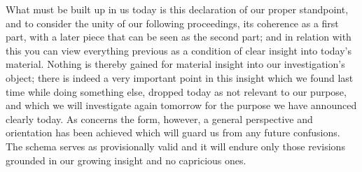 What must be built up in us today is
this declaration of our proper standpoint,
and to consider the unity of our following proceedings,
its coherence as a first part,
with a later piece that can be seen as the second part;
and in relation with this you can view
everything previous as a condition of
clear insight into today’s material.
Nothing is thereby gained for material insight
into our investigation’s object;
there is indeed a very important point in this insight
which we found last time while doing something else,
dropped today as not relevant to our purpose,
and which we will investigate again tomorrow
for the purpose we have announced clearly today.
As concerns the form, however,
a general perspective and orientation has been achieved
which will guard us from any future confusions.
The schema serves as provisionally valid
and it will endure only those revisions
grounded in our growing insight and no capricious ones.


